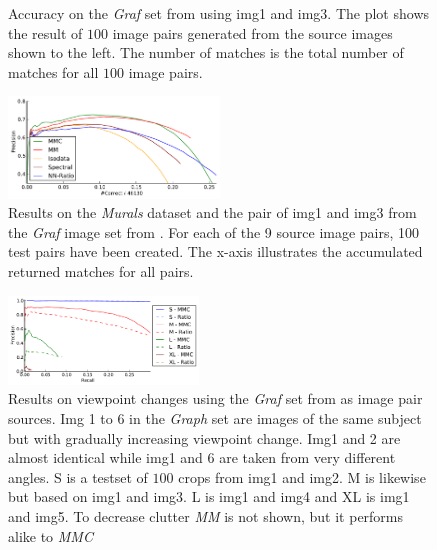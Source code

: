 \documentclass[conference]{IEEEtran}
\begin{document}
\begin{figure}
{\begin{subfigure}[t]{.27\textwidth}
		\end{subfigure}%
	}%
	\caption{Accuracy on the \emph{Graf} set from 
		\cite{mikolajczyk2005performance} using img1 and img3. The plot 
		shows the result of $100$ image pairs generated from the source 
		images shown to the left. The number of matches is the total 
		number of matches for all $100$ image pairs.}
	\label{fig:result_graf}
\end{figure}

\begin{figure}
	\centering
	\includegraphics[width=0.5\textwidth]{images/result_accumulated}
	\caption{Results on the \emph{Murals} dataset and the pair of img1 
		and img3 from the \emph{Graf} image set from 	
		\cite{mikolajczyk2005performance}. For each of the 9 source 
		image pairs, 100 test pairs have been created.  The x-axis 
	illustrates the accumulated returned matches for all pairs.}
	\label{fig:result_accumulated}
\end{figure}

\begin{figure}
	\centering
	\includegraphics[width=0.45\textwidth]{images/result_viewpoint}
	\caption{Results on viewpoint changes using the \emph{Graf} set from 
		\cite{mikolajczyk2005performance} as image pair sources. Img 1 
		to 6 in the \emph{Graph} set are images of the same subject but 
		with gradually increasing viewpoint change. Img1 and 2 are 
		almost identical while img1 and 6 are taken from very different 
		angles. S is a testset of $100$ crops from img1 and img2. M is 
	likewise but based on img1 and img3.  L is img1 and img4 and XL is 
img1 and img5.  To decrease clutter \emph{MM} is not shown, but it 
performs alike to \emph{MMC}}
	\label{fig:result_viewpoint}
\end{figure}
\end{document}
